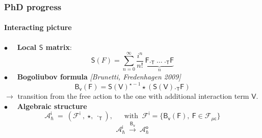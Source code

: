 \documentclass[9pt]{beamer}
\newcommand{\citebeam}[1]{\textit{\textcolor{black!60!white}{[#1]}}} %
\newcommand{\Acal}{\mathcal{A}}
\newcommand{\Fcal}{\mathcal{F}}
\newcommand{\Bsf}{\mathsf{B}}
\newcommand{\Fsf}{\mathsf{F}}
\newcommand{\Ssf}{\mathsf{S}}
\newcommand{\Tsf}{\mathsf{T}}
\newcommand{\Vsf}{\mathsf{V}}
\newcommand{\csf}{\mathsf{c}}
\newcommand{\isf}{\mathsf{i}}
\newcommand{\vsf}{\mathsf{v}}
\begin{document}
\begin{frame}

\frametitle{PhD progress}
\framesubtitle{Interacting picture}

$\bullet \quad$ \textbf{Local $\Ssf$ matrix}:
%
\begin{equation*}
 \Ssf(F) = \sum_{n=0}^{\infty} \frac{i^n}{n!} \ \underbrace{\Fsf ._\Tsf \ \dots \ ._\Tsf \Fsf}_{n}
\end{equation*}
%
%
$\bullet \quad$ \textbf{Bogoliubov formula} \citebeam{Brunetti, Fredenhagen 2009} \\ 
\vspace*{-8pt}
\begin{equation*}
\Bsf_\vsf(\Fsf) = \Ssf(\Vsf)^{\star -1} \star \left( \Ssf(\Vsf) ._{\Tsf} \Fsf \right) 
\end{equation*}
$\to$  transition from the free action to the one with additional interaction term $\Vsf$. \\[8pt]
%
%
$\bullet \quad$ \textbf{Algebraic structure}
%
\begin{equation*}
\Acal_\hbar^\isf  \ = \ \left( \Fcal^\isf \ , \ \star , \ \cdot_\Tsf \right), \ \quad \mbox{ with } \ \Fcal^\isf = \bigg\{ \Bsf_\vsf(\Fsf) , \ \Fsf \in \Fcal_{\mu\csf} \bigg\}
\end{equation*}
%
\begin{equation*}
\Acal_\hbar^\isf \ \overset{\Bsf_\vsf}{\longrightarrow} \ \Acal_\hbar^\mathsf{o}
\end{equation*}
%
\end{frame} 

\end{document}
